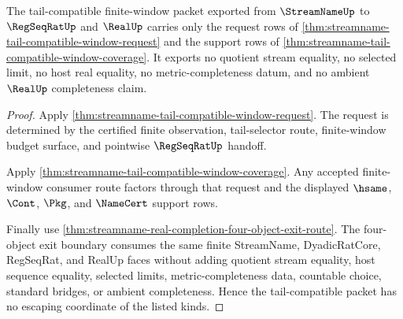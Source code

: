 \begin{theorem}
\label{thm:streamname-tail-compatible-window-nonescape}
The tail-compatible finite-window packet exported from $\StreamNameUp$ to
$\RegSeqRatUp$ and $\RealUp$ carries only the request rows of
\autoref{thm:streamname-tail-compatible-window-request} and the support rows
of \autoref{thm:streamname-tail-compatible-window-coverage}. It exports no
quotient stream equality, no selected limit, no host real equality, no
metric-completeness datum, and no ambient $\RealUp$ completeness claim.
\end{theorem}
\begin{proof}
Apply \autoref{thm:streamname-tail-compatible-window-request}. The request is
determined by the certified finite observation, tail-selector route,
finite-window budget surface, and pointwise $\RegSeqRatUp$ handoff.

Apply \autoref{thm:streamname-tail-compatible-window-coverage}. Any accepted
finite-window consumer route factors through that request and the displayed
$\hsame$, $\Cont$, $\Pkg$, and $\NameCert$ support rows.

Finally use \autoref{thm:streamname-real-completion-four-object-exit-route}.
The four-object exit boundary consumes the same finite StreamName,
DyadicRatCore, RegSeqRat, and RealUp faces without adding quotient stream
equality, host sequence equality, selected limits, metric-completeness data,
countable choice, standard bridges, or ambient completeness. Hence the
tail-compatible packet has no escaping coordinate of the listed kinds.
\end{proof}

